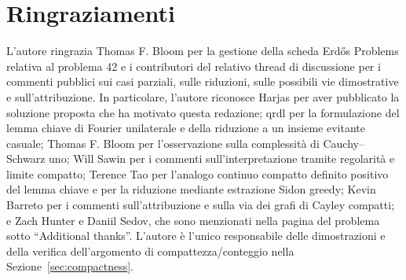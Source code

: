 \documentclass[11pt]{article}
\numberwithin{equation}{section}
\newcommand{\1}{\mathbf 1}
\begin{document}
\section*{Ringraziamenti}
L'autore ringrazia Thomas F. Bloom per la gestione della scheda Erd\H{o}s
Problems relativa al problema 42 e i contributori del relativo thread di
discussione per i commenti pubblici sui casi parziali, sulle riduzioni, sulle
possibili vie dimostrative e sull'attribuzione. In particolare, l'autore
riconosce Harjas per aver pubblicato la soluzione proposta che ha motivato
questa redazione; qrdl per la formulazione del lemma chiave di Fourier
unilaterale e della riduzione a un insieme evitante casuale; Thomas F. Bloom
per l'osservazione sulla complessità di Cauchy--Schwarz uno; Will Sawin per i
commenti sull'interpretazione tramite regolarità e limite compatto; Terence
Tao per l'analogo continuo compatto definito positivo del lemma chiave e per
la riduzione mediante estrazione Sidon greedy; Kevin Barreto per i commenti
sull'attribuzione e sulla via dei grafi di Cayley compatti; e Zach Hunter e
Daniil Sedov, che sono menzionati nella pagina del problema sotto
``Additional thanks''. L'autore è l'unico responsabile delle dimostrazioni e
della verifica dell'argomento di compattezza/conteggio nella
Sezione~\ref{sec:compactness}.
\end{document}

